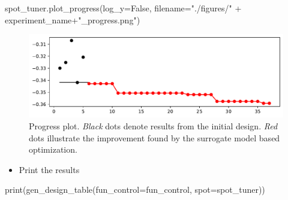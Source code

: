 \documentclass[
  letterpaper,
  DIV=11,
  numbers=noendperiod]{scrreprt}
\newenvironment{Shaded}{\begin{snugshade}}{\end{snugshade}}
\newcommand{\BuiltInTok}[1]{\textcolor[rgb]{0.00,0.23,0.31}{#1}}
\newcommand{\NormalTok}[1]{\textcolor[rgb]{0.00,0.23,0.31}{#1}}
\newcommand{\OperatorTok}[1]{\textcolor[rgb]{0.37,0.37,0.37}{#1}}
\newcommand{\StringTok}[1]{\textcolor[rgb]{0.13,0.47,0.30}{#1}}
\newcommand{\VariableTok}[1]{\textcolor[rgb]{0.07,0.07,0.07}{#1}}
\providecommand{\tightlist}{%
  \setlength{\itemsep}{0pt}\setlength{\parskip}{0pt}}\usepackage{longtable,booktabs,array}
\begin{document}
\begin{Shaded}
\begin{Highlighting}[]
\NormalTok{spot\_tuner.plot\_progress(log\_y}\OperatorTok{=}\VariableTok{False}\NormalTok{,}
\NormalTok{    filename}\OperatorTok{=}\StringTok{"./figures/"} \OperatorTok{+}\NormalTok{ experiment\_name}\OperatorTok{+}\StringTok{"\_progress.png"}\NormalTok{)}
\end{Highlighting}
\end{Shaded}

\begin{figure}[H]

{\centering \includegraphics{16_spot_hpt_sklearn_multiclass_classification_randomforest_files/figure-pdf/cell-28-output-1.pdf}

}

\caption{Progress plot. \emph{Black} dots denote results from the
initial design. \emph{Red} dots illustrate the improvement found by the
surrogate model based optimization.}

\end{figure}

\begin{itemize}
\tightlist
\item
  Print the results
\end{itemize}

\begin{Shaded}
\begin{Highlighting}[]
\BuiltInTok{print}\NormalTok{(gen\_design\_table(fun\_control}\OperatorTok{=}\NormalTok{fun\_control,}
\NormalTok{    spot}\OperatorTok{=}\NormalTok{spot\_tuner))}
\end{Highlighting}
\end{Shaded}
\end{document}
